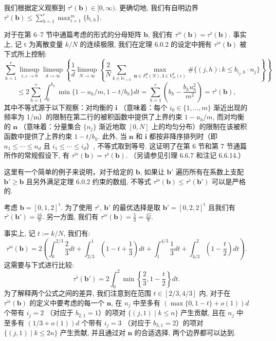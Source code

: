 \begin{remark}\label{rem:8.0.6}
我们根据定义观察到 \(\tau^{\flat}(\mathbf{b}) \in [0, \infty)\). 
更确切地, 我们有自明边界 \(\tau^{\flat}(\mathbf{b}) \leq \sum_{h=1}^{r} \max_{i=1}^{m} \{b_{i,h}\}\).

对于在第 6--7 节中通篇考虑的形式的分母矩阵 \(\mathbf{b}\), 我们有 \(\tau^{\flat\flat}(\mathbf{b}) = \tau^{\flat}(\mathbf{b})\). 
事实上, 记 t 为离散变量 \(k/N\) 的连续极限, 
我们在定理 6.0.2 的设定中拥有 \(\tau^{\flat\flat}(\mathbf{b})\) 被下式所上控制:
\[ \sum_{h=1}^{r} \limsup_{\epsilon, \varepsilon \to 0} \limsup_{d \to \infty} \left\{ \frac{1}{d} \limsup_{N \to \infty} \left\{ \frac{2}{N} \sum_{k \in \mathbb{N}_{>0}} \max_{\mathbf{n} \in P_{\varepsilon}^{d}(N), \mathbf{i} \in V_{m}^{d}(\epsilon)} \#\{(j, h) : k \leq b_{i_{j}, h} \cdot n_{j}\} \right\} \right\} \]
\[ \leq 2 \sum_{h=1}^{r} \int_{0}^{b_{h}} \min\{1 - u_{h}/m, 1 - t/b_{h}\} dt = \sum_{h=1}^{r} \left(b_{h} - \frac{b_{h}u_{h}^{2}}{m^{2}}\right) = \tau^{\flat}(\mathbf{b}), \]
其中不等式源于以下观察：对均衡的 \(\mathbf{i}\) （意味着：每个 \(i_0 \in \{1, \ldots, m\}\) 渐近出现的频率为 1/m）的限制在第二行的被积函数中提供了上界约束 \(1 - u_h/m\), 
而对均衡的 \(\mathbf{n}\) （意味着：分量集合 \(\{n_j\}\) 渐近地取 \([0, N]\) 上的均匀分布）的限制在该被积函数中提供了上界约束 \(1 - t/b_h\). 
此外, 当 \(\mathbf{n}\) 和 \(\mathbf{i}\) 都按非降序排列时（即 \(n_1 \leq \cdots \leq n_d\) 且 \(i_1 \leq \cdots \leq i_d\)）, 不等式取到等号. 
这证明了在第 6 节和第 7 节通篇所作的常规假设下, 有 \(\tau^{\flat\flat}(\mathbf{b}) = \tau^{\flat}(\mathbf{b})\). 
（另请参见引理 6.6.7 和注记 6.6.14.） \end{remark}

\begin{example}\label{ex:8.0.7}
这里有一个简单的例子来说明，对于给定的 \(\mathbf{b}\), 
如果让 \(\mathbf{b}'\) 遍历所有在系数上支配 \(\mathbf{b}' \geq \mathbf{b}\) 且另外满足定理 6.0.2 约束的数组, 
不等式 \(\tau^{\flat\flat}(\mathbf{b}) \leq \tau^{\flat}(\mathbf{b}')\) 可以是严格的.

考虑 \(\mathbf{b} = [0, 1, 2]^{\mathrm{t}}\). 为了使用 \(\tau^{\flat}\), 
\(\mathbf{b}'\) 的最优选择是取 \(\mathbf{b}' = [0, 2, 2]^{\mathrm{t}}\) 且我们有 \(\tau^{\flat}(\mathbf{b}') = \frac{16}{9}\). 
另一方面, 我们有 \(\tau^{\flat\flat}(\mathbf{b}) = \frac{5}{3} = \frac{15}{9}\).

事实上, 记 \(t := k/N\), 我们有:
\[ \tau^{\flat\flat}(\mathbf{b}) = 2\left(\int_0^{2/3} \frac{2}{3} dt + \int_{2/3}^1 \left(1 - t + \frac{1}{3}\right) dt + \int_1^{4/3} \frac{1}{3} dt + \int_{4/3}^2 \left(1 - \frac{t}{2}\right) dt\right). \]
这需要与下式进行比较:
\[ \tau^{\flat}(\mathbf{b}') = 2 \int_0^2 \min\left\{\frac{2}{3}, 1 - \frac{t}{2}\right\} dt. \]
为了解释两个公式之间的差异, 我们注意到在范围 \(t \in [2/3, 4/3]\) 内, 
对于在 \(\tau^{\flat\flat}(\mathbf{b})\) 的定义中要考虑的每一个 \(\mathbf{n}\), 
在 \(n_j\) 中至多有 \((\max\{0, 1-t\} + o(1))d\) 个带有 \(i_j = 2\) （对应于 \(b_{2,1} = 1\)）的项对 \(\{(j,1) \mid k \leq n\}\) 产生贡献, 
且在 \(n_j\) 中至多有 \((1/3 + o(1))d\) 个带有 \(i_j = 3\) （对应于 \(b_{3,1} = 2\)）的项对 \(\{(j,1) \mid k \leq 2n\}\) 产生贡献, 
并且通过对 \(\mathbf{n}\) 的合适选择, 两个边界都可以达到. \end{example}


